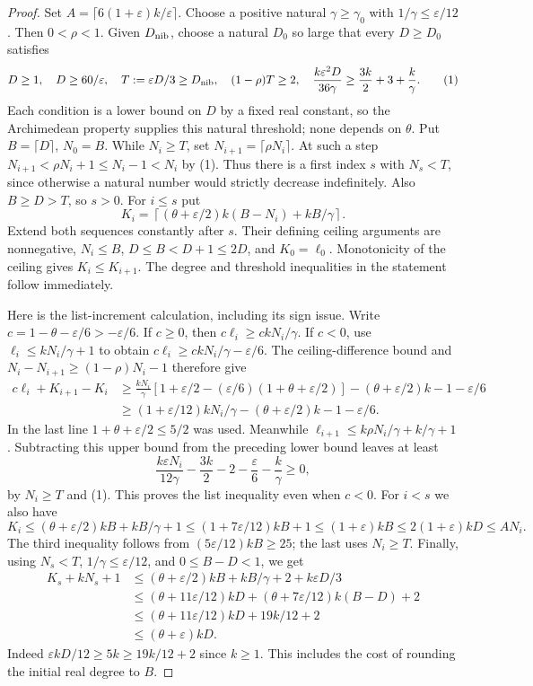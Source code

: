 \begin{proof}
Set $A=\lceil6(1+\varepsilon)k/\varepsilon\rceil$. Choose a positive
natural $\gamma\ge\gamma_0$ with $1/\gamma\le\varepsilon/12$.
Then $0<\rho<1$. Given $D_{\rm nib}$, choose a natural $D_0$ so large
that every $D\ge D_0$ satisfies
\[
D\ge1,\quad D\ge60/\varepsilon,\quad
T:=\varepsilon D/3\ge D_{\rm nib},\quad (1-\rho)T\ge2,
\quad \frac{k\varepsilon^2D}{36\gamma}\ge
\frac{3k}{2}+3+\frac{k}{\gamma}.
\tag{1}
\]
Each condition is a lower bound on $D$ by a fixed real constant,
so the Archimedean property supplies this natural threshold; none
depends on $\theta$.
Put $B=\lceil D\rceil$, $N_0=B$. While $N_i\ge T$, set
$N_{i+1}=\lceil\rho N_i\rceil$. At such a step
$N_{i+1}<\rho N_i+1\le N_i-1<N_i$ by (1).
Thus there is a first index $s$ with $N_s<T$, since otherwise a natural
number would strictly decrease indefinitely. Also $B\ge D>T$, so $s>0$.
For $i\le s$ put
\[
K_i=\left\lceil(\theta+\varepsilon/2)k(B-N_i)+kB/\gamma\right\rceil.
\]
Extend both sequences constantly after $s$. Their defining ceiling
arguments are nonnegative, $N_i\le B$, $D\le B<D+1\le2D$,
and $K_0=\ell_0$. Monotonicity of the ceiling gives $K_i\le K_{i+1}$.
The degree and threshold inequalities in the statement follow immediately.

Here is the list-increment calculation, including its sign issue. Write
$c=1-\theta-\varepsilon/6>-\varepsilon/6$. If $c\ge0$, then
$c\ell_i\ge ckN_i/\gamma$. If $c<0$, use
$\ell_i\le kN_i/\gamma+1$ to obtain
$c\ell_i\ge ckN_i/\gamma-\varepsilon/6$.
The ceiling-difference bound and
$N_i-N_{i+1}\ge(1-\rho)N_i-1$ therefore give
\[
\begin{aligned}
c\ell_i+K_{i+1}-K_i
&\ge \frac{kN_i}{\gamma}
 [1+\varepsilon/2-(\varepsilon/6)(1+\theta+\varepsilon/2)]
 -(\theta+\varepsilon/2)k-1-\varepsilon/6\\
&\ge (1+\varepsilon/12)kN_i/\gamma
 -(\theta+\varepsilon/2)k-1-\varepsilon/6.
\end{aligned}
\]
In the last line $1+\theta+\varepsilon/2\le5/2$ was used.
Meanwhile $\ell_{i+1}\le k\rho N_i/\gamma+k/\gamma+1$.
Subtracting this upper bound from the preceding lower bound leaves at least
\[
\frac{k\varepsilon N_i}{12\gamma}-\frac{3k}{2}-2
-\frac{\varepsilon}{6}-\frac{k}{\gamma}\ge0,
\]
by $N_i\ge T$ and (1). This proves the list inequality even when $c<0$.
For $i<s$ we also have
\[
K_i\le(\theta+\varepsilon/2)kB+kB/\gamma+1
\le(1+7\varepsilon/12)kB+1
\le(1+\varepsilon)kB\le2(1+\varepsilon)kD\le AN_i.
\]
The third inequality follows from
$(5\varepsilon/12)kB\ge25$; the last uses $N_i\ge T$.
Finally, using $N_s<T$, $1/\gamma\le\varepsilon/12$, and
$0\le B-D<1$, we get
\[
\begin{aligned}
K_s+kN_s+1
&\le(\theta+\varepsilon/2)kB+kB/\gamma+2+k\varepsilon D/3\\
&\le(\theta+11\varepsilon/12)kD
 +(\theta+7\varepsilon/12)k(B-D)+2\\
&\le(\theta+11\varepsilon/12)kD+19k/12+2\\
&\le(\theta+\varepsilon)kD.
\end{aligned}
\]
Indeed $\varepsilon kD/12\ge5k\ge19k/12+2$ since $k\ge1$.
This includes the cost of rounding the initial real degree to $B$.
\end{proof}
